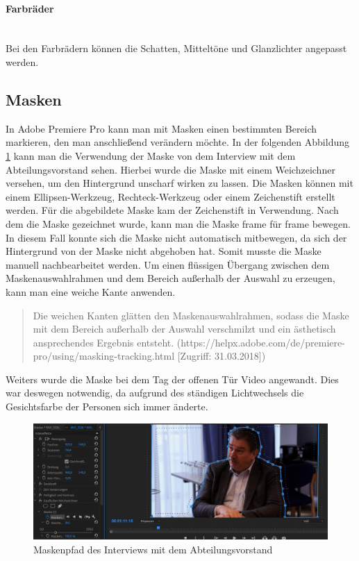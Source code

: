 \paragraph{Farbräder}
\leavevmode \\
Bei den Farbrädern können die Schatten, Mitteltöne und Glanzlichter angepasst werden.\citep{farbkorrektur}
\subsection{Masken}
In Adobe Premiere Pro kann man mit Masken einen bestimmten Bereich markieren, den man anschließend verändern möchte. In der folgenden Abbildung \ref{fig:abb28} kann man die Verwendung der Maske von dem Interview mit dem Abteilungsvorstand sehen. 
Hierbei wurde die Maske mit einem Weichzeichner versehen, um den Hintergrund unscharf wirken zu lassen. Die Masken können mit einem Ellipsen-Werkzeug, Rechteck-Werkzeug oder einem Zeichenstift erstellt werden. Für die abgebildete Maske kam der Zeichenstift in Verwendung. Nach dem die Maske gezeichnet wurde, kann man die Maske frame für frame bewegen. In diesem Fall konnte sich die Maske nicht automatisch mitbewegen, da sich der Hintergrund von der Maske nicht abgehoben hat. Somit musste die Maske manuell nachbearbeitet werden.\newline
Um einen flüssigen Übergang zwischen dem Maskenauswahlrahmen und dem Bereich außerhalb der Auswahl zu erzeugen, kann man eine weiche Kante anwenden.\citep{masken}\begin{quote}Die weichen Kanten glätten den Maskenauswahlrahmen, sodass die Maske mit dem Bereich außerhalb der Auswahl verschmilzt und ein ästhetisch ansprechendes Ergebnis entsteht. (https://helpx.adobe.com/de/premiere-pro/using/masking-tracking.html [Zugriff: 31.03.2018])\end{quote}
Weiters wurde die Maske bei dem Tag der offenen Tür Video angewandt. Dies war deswegen notwendig, da aufgrund des ständigen Lichtwechsels die Gesichtsfarbe der Personen sich immer änderte. 
\begin{figure}[H]
	\centering
	\includegraphics[width=1.0\textwidth]{abb28} 
	\caption{Maskenpfad des Interviews mit dem Abteilungsvorstand}\label{fig:abb28}
\end{figure}
